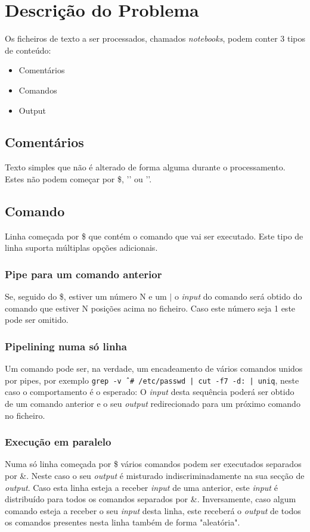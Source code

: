 \documentclass[12pt,a4paper]{report}
\begin{document}
\chapter{Descrição do Problema}
    Os ficheiros de texto a ser processados, chamados \textit{notebooks}, podem
    conter 3 tipos de conteúdo:
    \begin{itemize}
        \item Comentários
        \item Comandos
        \item Output
    \end{itemize}
    \section{Comentários}
        Texto simples que não é alterado de forma alguma durante o
        processamento. Estes não podem começar por \$, '\outputStart' ou
        '\outputEnd'.
    \section{Comando}
        Linha começada por \$ que contém o comando que vai ser executado.
        Este tipo de linha suporta múltiplas opções adicionais.
        \subsection{Pipe para um comando anterior}
            Se, seguido do \$, estiver um número N e um $|$ o \textit{input} do
            comando será obtido do comando que estiver N posições acima no
            ficheiro. Caso este número seja 1 este pode ser omitido.
        \subsection{Pipelining numa só linha}
            Um comando pode ser, na verdade, um encadeamento de vários comandos
            unidos por pipes, por exemplo
            \texttt{grep -v ˆ# /etc/passwd | cut -f7 -d: | uniq},
            neste caso o comportamento é o esperado: O \textit{input} desta
            sequência poderá ser obtido de um comando anterior e o seu
            \textit{output} redirecionado para um próximo comando no ficheiro.
        \subsection{Execução em paralelo}
            Numa só linha começada por \$ vários comandos podem ser executados
            separados por \&. Neste caso o seu \textit{output} é misturado
            indiscriminadamente na sua secção de \textit{output}. Caso esta
            linha esteja a receber \textit{input} de uma anterior, este
            \textit{input} é distribuído para todos os comandos separados por
            \&. Inversamente, caso algum comando esteja a receber o seu
            \textit{input} desta linha, este receberá o \textit{output} de todos
            os comandos presentes nesta linha também de forma "aleatória".
\end{document}
